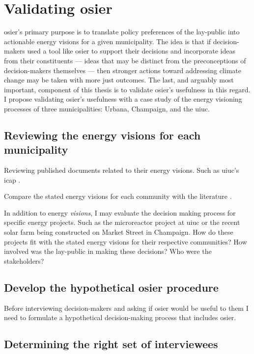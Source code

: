 \section{Validating \ac{osier}}

\ac{osier}'s primary purpose is to translate policy preferences of the
lay-public into actionable energy visions for a given municipality. The idea is
that if decision-makers used a tool like \ac{osier} to support their decisions
and incorporate ideas from their constituents --- ideas that may be distinct
from the preconceptions of decision-makers themselves --- then stronger actions
toward addressing climate change may be taken with more just outcomes. The last,
and arguably most important, component of this thesis is to validate
\ac{osier}'s usefulness in this regard. I propose validating \ac{osier}'s
usefulness with a case study of the energy visioning processes of three
municipalities: Urbana, Champaign, and the \ac{uiuc}.

\subsection{Reviewing the energy visions for each municipality}

Reviewing published documents related to their energy visions. Such as
\ac{uiuc}'s \ac{icap}
\cite{institute_for_sustainability_energy_and_environment_illinois_2020}.

Compare the stated energy visions for each community with the literature
\cite{elmallah_frontlining_2022}.

In addition to energy \textit{visions}, I may evaluate the decision making
process for specific energy projects. Such as the microreactor project at
\ac{uiuc} or the recent solar farm being constructed on Market Street in
Champaign. How do these projects fit with the stated energy visions for their
respective communities? How involved was the lay-public in making these
decisions? Who were the stakeholders?

\subsection{Develop the hypothetical \ac{osier} procedure}

Before interviewing decision-makers and asking if \ac{osier} would be useful to
them I need to formulate a hypothetical decision-making process that includes
\ac{osier}.

\subsection{Determining the right set of interviewees}

